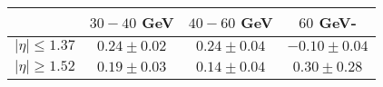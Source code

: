 \centering
\begin{tabular}{cccc} \toprule\toprule
 & $30-40$ GeV & $40-60$ GeV & $60$ GeV-\\\midrule
$\lvert \eta \rvert \leq 1.37$ & $0.24\pm0.02$ & $0.24\pm0.04$ & $-0.10\pm0.04$\\
$\lvert \eta \rvert \geq 1.52$ & $0.19\pm0.03$ & $0.14\pm0.04$ & $0.30\pm0.28$\\
\bottomrule\bottomrule
\end{tabular}

